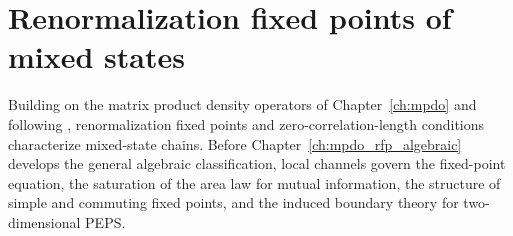 
\chapter{Renormalization fixed points of mixed states}\label{ch:mpdo_rfp}

Building on the matrix product density operators of Chapter~\ref{ch:mpdo} and
following \cite[Section~4]{Cirac2016MPDO_arXiv}, renormalization fixed points
and zero-correlation-length conditions characterize mixed-state chains. Before
Chapter~\ref{ch:mpdo_rfp_algebraic} develops the general algebraic
classification, local channels govern the fixed-point equation, the saturation
of the area law for mutual information, the structure of simple and commuting
fixed points, and the induced boundary theory for two-dimensional PEPS.





